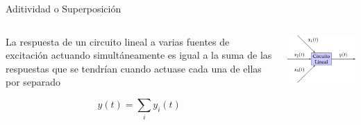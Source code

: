 \documentclass[aspectratio=169, usenames,svgnames,dvipsnames]{beamer}
\begin{document}
\begin{frame}[label={sec:org08bac37}]{Aditividad o Superposición}
\begin{columns}
\begin{column}{0.5\columnwidth}
La respuesta de un \alert{circuito lineal} a varias fuentes de excitación actuando simultáneamente es igual a la suma de las respuestas que se tendrían cuando actuase cada una de ellas por separado

\[
y(t) = \sum_i y_i(t)
\]
\end{column}

\begin{column}{0.5\columnwidth}
\begin{center}
\includegraphics[width=.9\linewidth]{../figs/superposicion.pdf}
\end{center}
\end{column}
\end{columns}
\end{frame}
\end{document}
